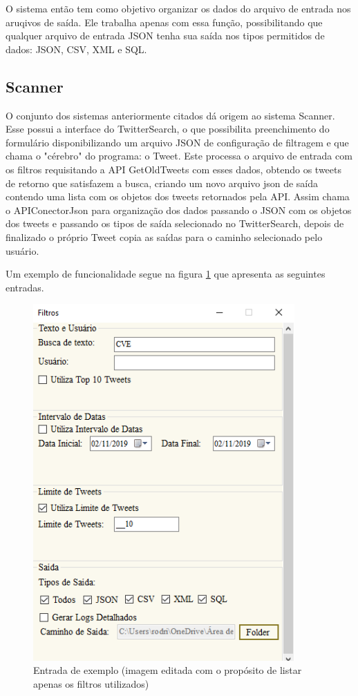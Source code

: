 O sistema então tem como objetivo organizar os dados do arquivo de entrada nos aruqivos de saída. Ele trabalha apenas com essa função, possibilitando que qualquer arquivo de entrada JSON tenha sua saída nos tipos permitidos de dados: JSON, CSV, XML e SQL. 

\subsection{Scanner}

O conjunto dos sistemas anteriormente citados dá origem ao sistema Scanner. Esse possui a interface do TwitterSearch, o que possibilita preenchimento do formulário disponibilizando um arquivo JSON de configuração de filtragem e que chama o "cérebro" do programa: o Tweet. Este processa o arquivo de entrada com os filtros requisitando a API GetOldTweets \cite{Pythoncommunity} com esses dados, obtendo os tweets de retorno que satisfazem a busca, criando um novo arquivo json de saída contendo uma lista com os objetos dos tweets retornados pela API. Assim chama o APIConectorJson para organização dos dados passando o JSON com os objetos dos tweets e passando os tipos de saída selecionado no TwitterSearch, depois de finalizado o próprio Tweet copia as saídas para o caminho selecionado pelo usuário.

Um exemplo de funcionalidade segue na figura \ref{fig:entrada1} que apresenta as seguintes entradas.

\begin{figure}[H]
\centering
\includegraphics[width=10cm]{imagens/entrada1.png}
\caption{Entrada de exemplo (imagem editada com o propósito de listar apenas os filtros utilizados)}
\label{fig:entrada1}
\end{figure}

